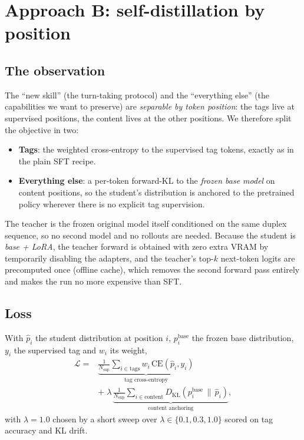 \documentclass[conference]{IEEEtran}
\begin{document}
\section{Approach B: self-distillation by position}
\label{sec:distill}

\subsection{The observation}
The ``new skill'' (the turn-taking protocol) and the ``everything else'' (the
capabilities we want to preserve) are \emph{separable by token position}: the tags
live at supervised positions, the content lives at the other positions. We
therefore split the objective in two:

\begin{itemize}
  \item \textbf{Tags}: the weighted cross-entropy to the supervised tag tokens,
        exactly as in the plain SFT recipe.
  \item \textbf{Everything else}: a per-token forward-KL to the \emph{frozen base
        model} on content positions, so the student's distribution is anchored to
        the pretrained policy wherever there is no explicit tag supervision.
\end{itemize}

The teacher is the frozen original model itself conditioned on the same duplex
sequence, so no second model and no rollouts are needed. Because the student is
\emph{base + LoRA}, the teacher forward is obtained with zero extra VRAM by
temporarily disabling the adapters, and the teacher's top-$k$ next-token logits
are precomputed once (offline cache), which removes the second forward pass
entirely and makes the run no more expensive than SFT.

\subsection{Loss}
With $\hat{p}_i$ the student distribution at position $i$, $p^{\text{base}}_i$ the
frozen base distribution, $y_i$ the supervised tag and $w_i$ its weight,
\[
\begin{aligned}
\mathcal{L} ={}&
\underbrace{\frac{1}{N_{\text{sup}}}\sum_{i\in\text{tags}}
w_i\,\text{CE}(\hat{p}_i, y_i)}_{\text{tag cross-entropy}}\\
&+\;\lambda\,\underbrace{\frac{1}{N_{\text{sup}}}\sum_{i\in\text{content}}
D_{\text{KL}}\!\left(p^{\text{base}}_i \,\|\, \hat{p}_i\right)}_{\text{content
anchoring}},
\end{aligned}
\]
with $\lambda=1.0$ chosen by a short sweep over $\lambda\in\{0.1,0.3,1.0\}$ scored
on tag accuracy and KL drift.
\end{document}
